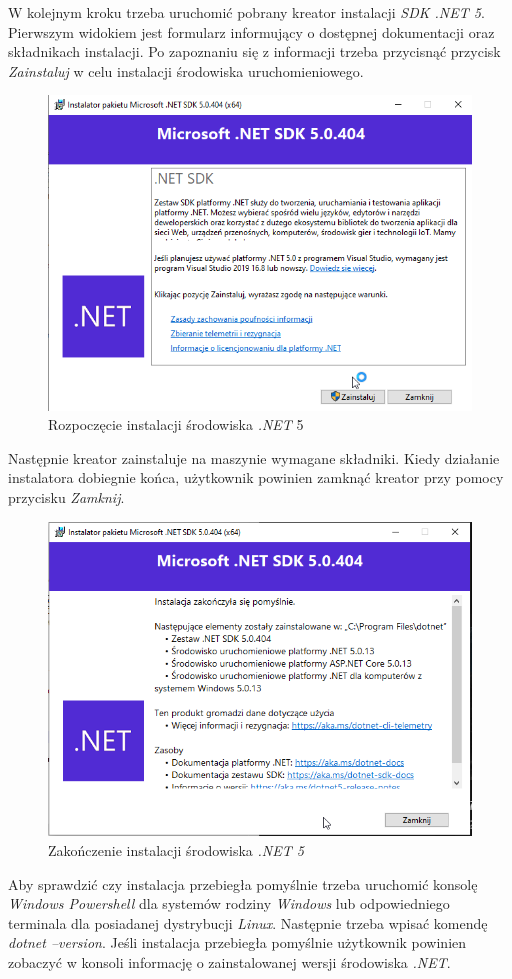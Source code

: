 \documentclass[a4paper,twoside,12pt]{book}
\begin{document}
{W kolejnym kroku trzeba uruchomić pobrany kreator instalacji \textit{SDK .NET 5}. Pierwszym widokiem jest formularz informujący o dostępnej dokumentacji oraz składnikach instalacji. Po zapoznaniu się z informacji trzeba przycisnąć przycisk \textit{Zainstaluj} w celu instalacji środowiska uruchomieniowego.
\begin{figure}[h!]
	\centering
	\includegraphics[width=0.7\linewidth]{../zrzuty_ekranu/instalacja_dotnet5/dotnet1}
	\caption{Rozpoczęcie instalacji środowiska \textit{.NET }5}
	\label{fig:dotnet1}
\end{figure}
\FloatBarrier

Następnie kreator zainstaluje na maszynie wymagane składniki. Kiedy działanie instalatora dobiegnie końca, użytkownik powinien zamknąć kreator przy pomocy przycisku \textit{Zamknij}.

\begin{figure}[h!]
	\centering
	\includegraphics[width=0.7\linewidth]{../zrzuty_ekranu/instalacja_dotnet5/dotnet_finish}
	\caption{Zakończenie instalacji środowiska \textit{.NET 5}}
	\label{fig:dotnetfinish}
\end{figure}
\FloatBarrier

Aby sprawdzić czy instalacja przebiegła pomyślnie trzeba uruchomić konsolę \textit{Windows Powershell} dla systemów rodziny \textit{Windows} lub odpowiedniego terminala dla posiadanej dystrybucji \textit{Linux}. Następnie trzeba wpisać komendę \textit{dotnet --version}. Jeśli instalacja przebiegła pomyślnie użytkownik powinien zobaczyć w konsoli informację o zainstalowanej wersji środowiska \textit{.NET}.

}
\end{document}

